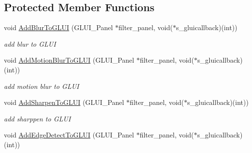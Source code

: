 \subsection*{Protected Member Functions}
\begin{DoxyCompactItemize}
\item 
void \hyperlink{classimage__tools_1_1FilterManager_ae85ce9fc1146be4b403187064bb7cd97}{Add\+Blur\+To\+G\+L\+UI} (G\+L\+U\+I\+\_\+\+Panel $\ast$filter\+\_\+panel, void($\ast$s\+\_\+gluicallback)(int))\hypertarget{classimage__tools_1_1FilterManager_ae85ce9fc1146be4b403187064bb7cd97}{}\label{classimage__tools_1_1FilterManager_ae85ce9fc1146be4b403187064bb7cd97}

\begin{DoxyCompactList}\small\item\em add blur to G\+L\+UI \end{DoxyCompactList}\item 
void \hyperlink{classimage__tools_1_1FilterManager_a023cb6f79a31c7635c73aed94ad8f684}{Add\+Motion\+Blur\+To\+G\+L\+UI} (G\+L\+U\+I\+\_\+\+Panel $\ast$filter\+\_\+panel, void($\ast$s\+\_\+gluicallback)(int))\hypertarget{classimage__tools_1_1FilterManager_a023cb6f79a31c7635c73aed94ad8f684}{}\label{classimage__tools_1_1FilterManager_a023cb6f79a31c7635c73aed94ad8f684}

\begin{DoxyCompactList}\small\item\em add motion blur to G\+L\+UI \end{DoxyCompactList}\item 
void \hyperlink{classimage__tools_1_1FilterManager_aaeaa991e824af5651604240bf6841f4d}{Add\+Sharpen\+To\+G\+L\+UI} (G\+L\+U\+I\+\_\+\+Panel $\ast$filter\+\_\+panel, void($\ast$s\+\_\+gluicallback)(int))\hypertarget{classimage__tools_1_1FilterManager_aaeaa991e824af5651604240bf6841f4d}{}\label{classimage__tools_1_1FilterManager_aaeaa991e824af5651604240bf6841f4d}

\begin{DoxyCompactList}\small\item\em add sharppen to G\+L\+UI \end{DoxyCompactList}\item 
void \hyperlink{classimage__tools_1_1FilterManager_a8ea1737814292a8248e87f68772bba84}{Add\+Edge\+Detect\+To\+G\+L\+UI} (G\+L\+U\+I\+\_\+\+Panel $\ast$filter\+\_\+panel, void($\ast$s\+\_\+gluicallback)(int))\hypertarget{classimage__tools_1_1FilterManager_a8ea1737814292a8248e87f68772bba84}{}\label{classimage__tools_1_1FilterManager_a8ea1737814292a8248e87f68772bba84}


\end{DoxyCompactItemize}
